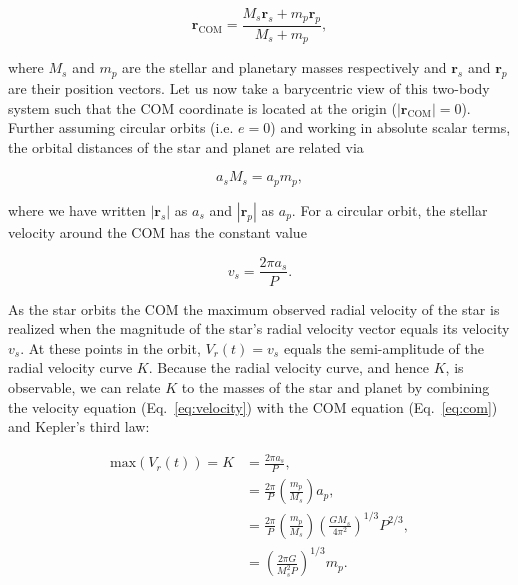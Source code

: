 \begin{equation}
\mathbf{r}_{\mathrm{COM}} = \frac{M_s \mathbf{r}_s + m_p \mathbf{r}_p}{M_s + m_p},
\end{equation}

\noindent where $M_s$ and $m_p$ are the stellar and planetary masses respectively and
$\mathbf{r}_s$ and $\mathbf{r}_p$ are their position vectors. 
Let us now take a barycentric view of this two-body system such that the 
COM coordinate is located at the origin ($|\mathbf{r}_{\mathrm{COM}}|=0$). Further
assuming circular orbits (i.e. $e=0$) and working 
in absolute scalar terms, the orbital distances of the star and planet are  
related via 

\begin{equation}
a_s M_s = a_p m_p,
\label{eq:com}
\end{equation}
  
\noindent where we have written $|\mathbf{r}_s|$ as $a_s$ and 
$|\mathbf{r}_p|$ as $a_p$. For a circular orbit, the stellar velocity around the COM has
the constant value

\begin{equation}
v_s = \frac{2\pi a_s}{P}.
\label{eq:velocity}
\end{equation}

\noindent As the star orbits the COM the maximum observed radial velocity of the star
is realized when the magnitude of the star's radial velocity vector
equals its velocity $v_s$. At these points in the orbit, $V_r(t)=v_s$ equals the semi-amplitude 
of the radial velocity curve $K$. Because the radial velocity 
curve, and hence $K$, is observable, 
we can relate $K$ to the masses of the star and planet by combining the velocity 
equation (Eq.~\ref{eq:velocity}) with the COM equation (Eq.~\ref{eq:com})
and Kepler's third law:

\begin{align}
\mathrm{max}(V_r(t)) = K &= \frac{2\pi a_s}{P}, \\
&= \frac{2\pi}{P} \left( \frac{m_p}{M_s} \right) a_p, \\
&= \frac{2\pi}{P} \left( \frac{m_p}{M_s} \right) \left( \frac{GM_s}{4\pi^2} \right)^{1/3} P^{2/3}, \\
&= \left( \frac{2\pi G}{M_s^2 P} \right)^{1/3} m_p. \label{eq:K1}
\end{align}

